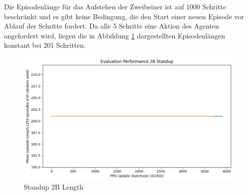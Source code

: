 Die Episodenlänge für das Aufstehen der Zweibeiner ist auf 1000 Schritte beschränkt und es gibt keine Bedingung, die den Start einer neuen Episode vor Ablauf der Schritte fordert. Da alle 5 Schritte eine Aktion des Agenten angefordert wird, liegen die in Abbildung \ref{fig:Standup2B_Length} dargestellten Episodenlängen konstant bei 201 Schritten.

\begin{figure}[ht]
    \centering
    \includegraphics[width=0.5\linewidth]{resources/img/results/Standup2B_Length.png}
    \caption{Standup 2B Length}\label{fig:Standup2B_Length}
\end{figure}

